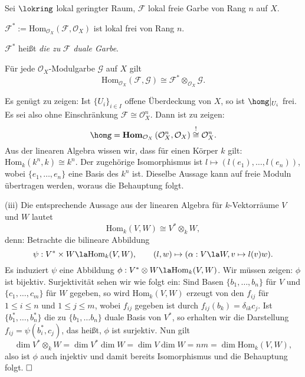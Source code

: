 \documentclass[11pt]{book}
\theoremstyle{nonumberbreak}
\newenvironment{pr}[1][]{\ifthenelse{\equal{#1}{}}{\proof}{\proof[#1]}\rm}{\endproof}
\newenvironment{definprop}[1][]{\ifthenelse{\equal{#1}{}}{\definiprop}{\definiprop[#1]}\rm}{\enddefiniprop}
\begin{document}
\begin{spacing}{1.4}
\begin{definprop}
Sei $\lokring$ lokal geringter Raum, $\mathcal{F}$ lokal freie Garbe von Rang $n$ auf $X$.
\begin{compactenum}
\item $\mathcal{F}^* := \boldsymbol{\mathrm{Hom}}_{\mathcal{O}_X}(\mathcal{F}, \mathcal{O}_X)$ ist lokal frei von Rang $n$.
\item $\mathcal{F}^*$ heißt \textit{die zu} $\mathcal{F}$ \textit{duale Garbe}.
\item Für jede $\mathcal{O}_X$-Modulgarbe $\mathcal{G}$ auf $X$ gilt 
$$\boldsymbol{\mathrm{Hom}}_{\mathcal{O}_X}(\mathcal{F}, \mathcal{G}) \cong \mathcal{F}^* \otimes_{\mathcal{O}_X} \mathcal{G}.$$
\end{compactenum}
\begin{pr}
\begin{compactenum}
\item Es genügt zu zeigen: Ist $\{U_i\}_{i \in I}$ offene Überdeckung von $X$, so ist $\homg \vert_{U_i}$ frei. Es sei also ohne Einschränkung $\mathcal{F} \cong \mathcal{O}_X^n$. Dann ist zu zeigen: 
$$\homg  = \boldsymbol{\mathrm{Hom}}_{\mathcal{O}_X}\left(\mathcal{O}_X^n, \mathcal{O}_X\right) \overset{!}{\cong} \mathcal{O}_X^n.$$
Aus der linearen Algebra wissen wir, dass für einen Körper $k$ gilt: $\mathrm{Hom}_k(k^n,k) \cong k^n$. Der zugehörige Isomorphismus ist $l \mapsto \left(l(e_1), \ldots, l(e_n)\right)$, wobei $\{e_1, \ldots, e_n\}$ eine Basis des $k^n$ ist. Dieselbe Aussage kann auf freie Moduln übertragen werden, woraus die Behauptung folgt.
\item[(iii)] Die entsprechende Aussage aus der linearen Algebra für $k$-Vektorräume $V$ und $W$ lautet
$$\mathrm{Hom}_k(V,W) \cong V^* \otimes_k W,$$
denn: Betrachte die bilineare Abbildung 
$$\psi: V^* \times W \la \mathrm{Hom}_k(V,W), \qquad (l,w) \mapsto (\alpha: V \la W, v \mapsto l(v) w).$$
Es induziert $\psi$ eine Abbildung $\phi: V^* \otimes W \la \mathrm{Hom}_k(V,W)$. Wir müssen zeigen: $\phi$ ist bijektiv. Surjektivität sehen wir wie folgt ein: Sind Basen $\{b_1, \ldots, b_n\}$ für $V$ und $\{c_1, \ldots, c_m\}$ für $W$ gegeben, so wird $\mathrm{Hom}_k(V,W)$ erzeugt von den $f_{ij}$ für $1 \leqslant i \leqslant n$ und $1 \leqslant j \leqslant m$, wobei $f_{ij}$ gegeben ist durch $f_{ij}(b_k) = \delta_{ik}c_j$. Ist $\{b_1^*, \ldots, b_n^*\}$ die zu $\{b_1, \ldots b_n\}$ duale Basis von $V^*$, so erhalten wir die Darstellung
$f_{ij}= \psi(b_i^*, c_j)$, das heißt, $\phi$ ist surjektiv. Nun gilt 
$$\dim V^* \otimes_k W = \dim V^* \dim W = \dim V \dim W = nm = \dim \mathrm{Hom}_k(V,W),$$
also ist $\phi$ auch injektiv und damit bereits Isomorphismus und die Behauptung folgt. $\hfill \Box$



\end{compactenum}
\end{pr}
\end{definprop}
\end{spacing}
\end{document}
